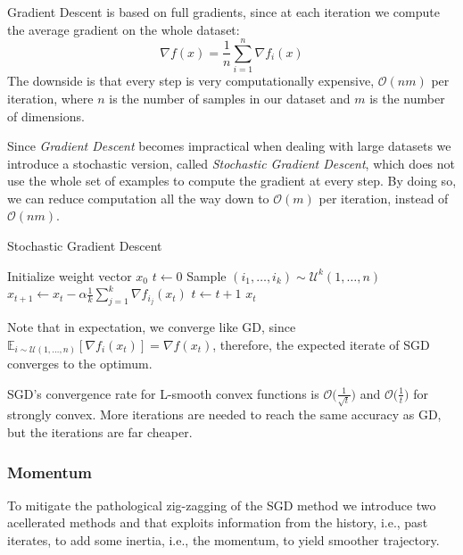 Gradient Descent is based on full gradients, since at each iteration we compute the average gradient on the whole dataset:
$$
\nabla f(x) = \frac{1}{n} \sum_{i=1}^n \nabla f_i(x)
$$
The downside is that every step is very computationally expensive, $\mathcal{O}(nm)$ per iteration, where $n$ is the number of samples in our dataset and $m$ is the number of dimensions.

Since \emph{Gradient Descent} becomes impractical when dealing with large datasets we introduce a stochastic version, called \emph{Stochastic Gradient Descent}, which does not use the whole set of examples to compute the gradient at every step. By doing so, we can reduce computation all the way down to $\mathcal{O}(m)$ per iteration, instead of $\mathcal{O}(nm)$.

\begin{algorithm}[H]
	\caption{Stochastic Gradient Descent}
	\label{alg:sgd}
	\begin{algorithmic}
			\State Initialize weight vector $x_0$
			\State $t \gets 0$
				\State Sample $(i_1,\dots,i_k) \sim \mathcal{U}^k(1,\dots,n)$ 
				\State $\displaystyle x_{t+1} \gets x_t - \alpha \frac{1}{k} \sum_{j=1}^k \nabla f_{i_j}(x_t)$
				\State $t \gets t + 1$
			\EndWhile
			\State \Return $x_t$
		\EndFunction
	\end{algorithmic}
\end{algorithm}

Note that in expectation, we converge like GD, since $\displaystyle \mathbb{E}_{i \sim \mathcal{U}(1,\dots,n)}[\nabla f_i(x_t)] = \nabla f(x_t)$, therefore, the expected iterate of SGD converges to the optimum.

SGD’s convergence rate for L-smooth convex functions is $\displaystyle \mathcal{O}\Big(\frac{1}{\sqrt{t}}\Big)$ and $\displaystyle \mathcal{O}\Big(\frac{1}{t}\Big)$ for strongly convex. More iterations are needed to reach the same accuracy as GD, but the iterations are far cheaper.

\subsubsection{Momentum} 

To mitigate the pathological zig-zagging of the SGD method we introduce two acellerated methods \cite{polyak1964some} and \cite{nesterov1998introductory} that exploits information from the history, i.e., past iterates, to add some inertia, i.e., the momentum, to yield smoother trajectory.

